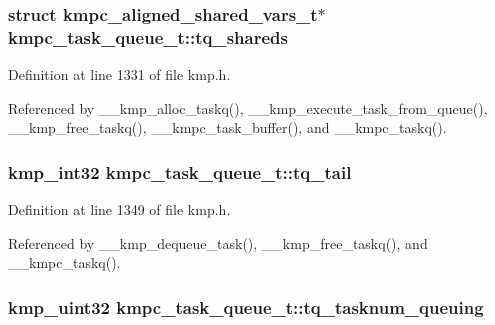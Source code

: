 \hypertarget{structkmpc__task__queue__t_aa91c6d5fa60d60d24b69726f9e99442e}{
\subsubsection[{tq\-\_\-shareds}]{\setlength{\rightskip}{0pt plus 5cm}struct {\bf kmpc\-\_\-aligned\-\_\-shared\-\_\-vars\-\_\-t}$\ast$ kmpc\-\_\-task\-\_\-queue\-\_\-t\-::tq\-\_\-shareds}}\label{structkmpc__task__queue__t_aa91c6d5fa60d60d24b69726f9e99442e}


Definition at line 1331 of file kmp.\-h.



Referenced by \-\_\-\-\_\-kmp\-\_\-alloc\-\_\-taskq(), \-\_\-\-\_\-kmp\-\_\-execute\-\_\-task\-\_\-from\-\_\-queue(), \-\_\-\-\_\-kmp\-\_\-free\-\_\-taskq(), \-\_\-\-\_\-kmpc\-\_\-task\-\_\-buffer(), and \-\_\-\-\_\-kmpc\-\_\-taskq().

\hypertarget{structkmpc__task__queue__t_a9cabfcfff0691551b1b82ac45e3491c6}{
\subsubsection[{tq\-\_\-tail}]{\setlength{\rightskip}{0pt plus 5cm}kmp\-\_\-int32 kmpc\-\_\-task\-\_\-queue\-\_\-t\-::tq\-\_\-tail}}\label{structkmpc__task__queue__t_a9cabfcfff0691551b1b82ac45e3491c6}


Definition at line 1349 of file kmp.\-h.



Referenced by \-\_\-\-\_\-kmp\-\_\-dequeue\-\_\-task(), \-\_\-\-\_\-kmp\-\_\-free\-\_\-taskq(), and \-\_\-\-\_\-kmpc\-\_\-taskq().

\hypertarget{structkmpc__task__queue__t_a7b1cdbff4f4f72e05cdf28dbb0b25cc9}{
\subsubsection[{tq\-\_\-tasknum\-\_\-queuing}]{\setlength{\rightskip}{0pt plus 5cm}kmp\-\_\-uint32 kmpc\-\_\-task\-\_\-queue\-\_\-t\-::tq\-\_\-tasknum\-\_\-queuing}}\label{structkmpc__task__queue__t_a7b1cdbff4f4f72e05cdf28dbb0b25cc9}


